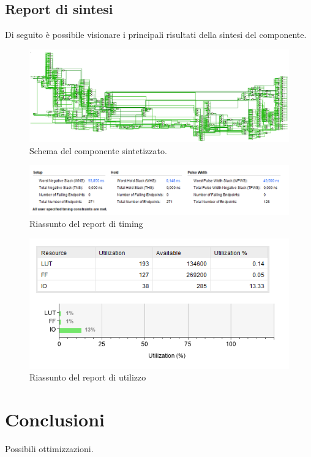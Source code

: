 \documentclass{article}
\begin{document}
\pagebreak

\subsection{Report di sintesi}
Di seguito è possibile visionare i principali risultati della sintesi del componente.

\begin{figure}[h]
    \includegraphics[width=\textwidth]{schema.png}
    \centering
    \caption{Schema del componente sintetizzato.}
\end{figure}

\begin{figure}[h]
    \includegraphics[width=\textwidth]{timing.png}
    \centering
    \caption{Riassunto del report di timing}
\end{figure}

\begin{figure}[h]
    \includegraphics[scale=0.5]{utilization.png}
    \centering
    \caption{Riassunto del report di utilizzo}
\end{figure}

\pagebreak
\section{Conclusioni}
Possibili ottimizzazioni.

\pagebreak
\printbibliography
\end{document}
